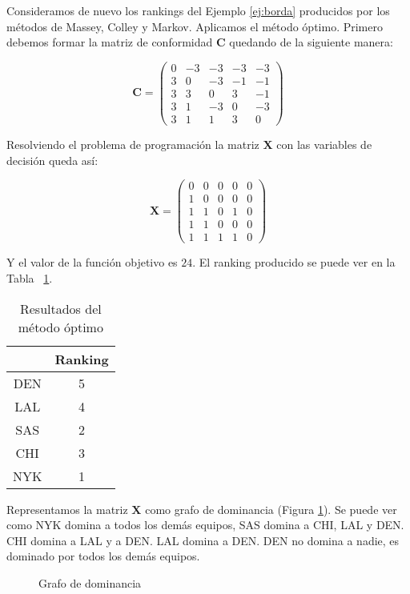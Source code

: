 \begin{ejemplo} \label{ej:optimo}
Consideramos de nuevo los rankings del Ejemplo \ref{ej:borda} producidos por los métodos de Massey, Colley y Markov. Aplicamos el método óptimo. Primero debemos formar la matriz de conformidad $\mathbf{C}$ quedando de la siguiente manera:

\begin{equation*}
\mathbf{C} = \left(\begin{array}{rrrrr}
0 & -3 & -3 & -3 & -3 \\
3 &  0 & -3 & -1 & -1 \\
3 &  3 &  0 &  3 & -1 \\
3 &  1 & -3 &  0 & -3 \\
3 &  1 &  1	&  3 &	0
\end{array}\right)
\end{equation*}

Resolviendo el problema de programación la matriz $\mathbf{X}$ con las variables de decisión queda así:

\begin{equation*}
\mathbf{X} = \left(\begin{array}{rrrrr}
0 & 0 & 0 & 0 & 0 \\
1 & 0 & 0 & 0 & 0 \\
1 & 1 & 0 & 1 & 0 \\
1 & 1 & 0 & 0 & 0 \\
1 & 1 & 1 & 1 &	0
\end{array}\right)
\end{equation*}

Y el valor de la función objetivo es $24$. El ranking producido se puede ver en la Tabla~ \ref{tbl:optimo_resultados}.

\begin{table}[h]
\centering
\caption{Resultados del método óptimo}
\label{tbl:optimo_resultados}
\begin{tabular}{@{}cc@{}}
\cmidrule(l){2-2}
    & Ranking \\ \midrule
DEN & 5       \\
LAL & 4       \\
SAS & 2       \\
CHI & 3       \\
NYK & 1       \\ \bottomrule
\end{tabular}
\end{table}

Representamos la matriz $\mathbf{X}$ como grafo de dominancia (Figura \ref{fig:ejemplo_grafo_dominancia_optimo}). Se puede ver como NYK domina a todos los demás equipos, SAS domina a CHI, LAL y DEN. CHI domina a LAL y a DEN. LAL domina a DEN. DEN no domina a nadie, es dominado por todos los demás equipos.

\begin{figure}[htb]
\centering
\ejemplografodominanciaoptimo
\caption{Grafo de dominancia}
\label{fig:ejemplo_grafo_dominancia_optimo}
\end{figure}

\end{ejemplo}

